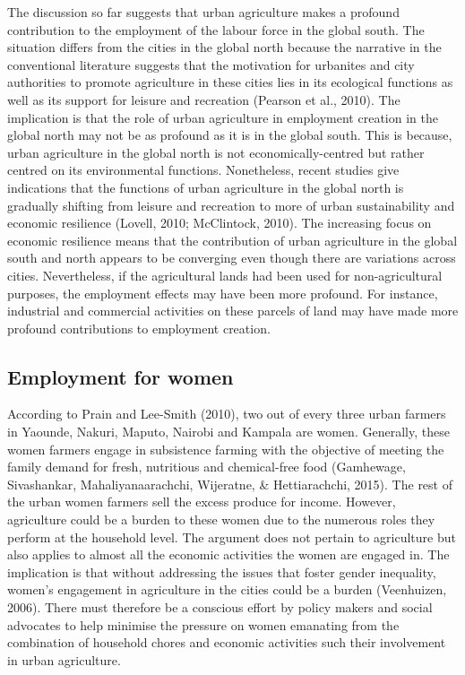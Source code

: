 The discussion so far suggests that urban agriculture makes a profound contribution to the employment of the labour force in the global south. The situation differs from the cities in the global north because the narrative in the conventional literature suggests that the motivation for urbanites and city authorities to promote agriculture in these cities lies in its ecological functions as well as its support for leisure and recreation (Pearson et al., 2010). The implication is that the role of urban agriculture in employment creation in the global north may not be as profound as it is in the global south. This is because, urban agriculture in the global north is not economically-centred but rather centred on its environmental functions. Nonetheless, recent studies give indications that the functions of urban agriculture in the global north is gradually shifting from leisure and recreation to more of urban sustainability and economic resilience (Lovell, 2010; McClintock, 2010). The increasing focus on economic resilience means that the contribution of urban agriculture in the global south and north appears to be converging even though there are variations across cities. Nevertheless, if the agricultural lands had been used for non-agricultural purposes, the employment effects may have been more profound. For instance, industrial and commercial activities on these parcels of land may have made more profound contributions to employment creation.

\subsection{Employment for women}

According to Prain and Lee-Smith (2010), two out of every three urban farmers in Yaounde, Nakuri, Maputo, Nairobi and Kampala are women. Generally, these women farmers engage in subsistence farming with the objective of meeting the family demand for fresh, nutritious and chemical-free food (Gamhewage, Sivashankar, Mahaliyanaarachchi, Wijeratne, \& Hettiarachchi, 2015). The rest of the urban women farmers sell the excess produce for income. However, agriculture could be a burden to these women due to the numerous roles they perform at the household level. The argument does not pertain to agriculture but also applies to almost all the economic activities the women are engaged in. The implication is that without addressing the issues that foster gender inequality, women's engagement in agriculture in the cities could be a burden (Veenhuizen, 2006). There must therefore be a conscious effort by policy makers and social advocates to help minimise the pressure on women emanating from the combination of household chores and economic activities such their involvement in urban agriculture.

